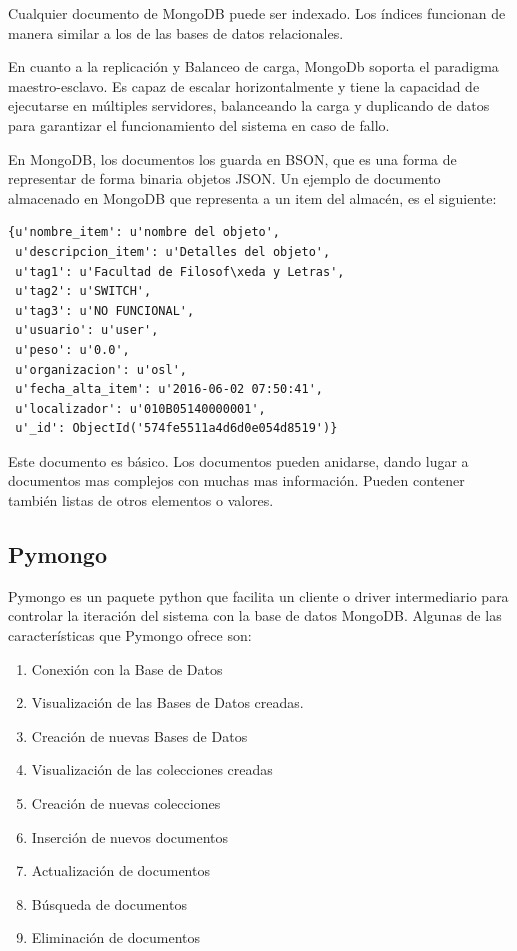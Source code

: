 \documentclass[a4paper,11pt]{book}
\begin{document}
Cualquier documento de MongoDB puede ser indexado. Los índices funcionan de manera similar a los de las bases de datos relacionales. 

En cuanto a la replicación y Balanceo de carga, MongoDb soporta el paradigma maestro-esclavo. Es capaz de escalar horizontalmente y tiene la capacidad de ejecutarse en múltiples servidores, balanceando la carga y duplicando de datos para garantizar el funcionamiento del sistema en caso de fallo. 

En MongoDB, los documentos los guarda en BSON, que es una forma de representar de forma binaria objetos JSON. Un ejemplo de documento almacenado en MongoDB que representa a un item del almacén, es el siguiente:

\begin{lstlisting}
{u'nombre_item': u'nombre del objeto', 
 u'descripcion_item': u'Detalles del objeto', 
 u'tag1': u'Facultad de Filosof\xeda y Letras',
 u'tag2': u'SWITCH',
 u'tag3': u'NO FUNCIONAL',
 u'usuario': u'user',
 u'peso': u'0.0',
 u'organizacion': u'osl',
 u'fecha_alta_item': u'2016-06-02 07:50:41',
 u'localizador': u'010B05140000001',
 u'_id': ObjectId('574fe5511a4d6d0e054d8519')}

\end{lstlisting}

Este documento es básico. Los documentos pueden anidarse, dando lugar a documentos mas complejos con muchas mas información. Pueden contener también listas de otros elementos o valores. 

\subsection{Pymongo} 
Pymongo\cite{pymongo} es un paquete python que facilita un cliente o driver intermediario para controlar la iteración del sistema con la base de datos MongoDB. Algunas de las características que Pymongo ofrece son:

\begin{enumerate}
\item Conexión con la Base de Datos
\item Visualización de las Bases de Datos creadas.
\item Creación de nuevas Bases de Datos
\item Visualización de las colecciones creadas
\item Creación de nuevas colecciones
\item Inserción de nuevos documentos
\item Actualización de documentos
\item Búsqueda de documentos
\item Eliminación de documentos
\end{enumerate}
\end{document}
